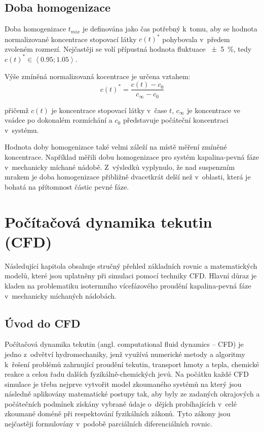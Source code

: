 \subsection{Doba homogenizace}
Doba homogenizace $t_{mix}$ je definována jako čas potřebný k~tomu, aby se hodnota normalizované koncentrace stopovací látky $c(t)^{*}$ pohybovala v~předem zvoleném rozmezí. Nejčastěji se volí přípustná hodnota fluktuace \SI{\pm 5}{\percent}, tedy $c(t)^{*} \in \left<\num{0.95};\num{1.05}\right>$. 

Výše zmíněná normalizovaná kocentrace je určena vztahem:
\begin{equation}
	c(t)^{*} = \frac{c(t) - c_{0}}{c_{\infty} - c_{0}}
	\label{eq:bezkon}
\end{equation}

\noindent přičemž $c(t)$ je koncentrace stopovací látky v~čase $t$, $c_{\infty}$ je koncentrace ve vsádce po dokonalém rozmíchání a $c_{0}$ představuje počáteční koncentraci v~systému.  

Hodnota doby homogenizace také velmi záleží na místě měření zmíněné koncentrace. Například \citet{buj99} měřili dobu homogenizace pro systém kapalina-pevná fáze v~mechanicky míchané nádobě. Z~výsledků vyplynulo, že nad suspenzním mrakem je doba homogenizace přibližně dvacetkrát delší než v~oblasti, která je bohatá na přítomnost částic pevné fáze.

\section{Počítačová dynamika tekutin (CFD)}
Následující kapitola obsahuje stručný přehled základních rovnic a matematických modelů, které jsou uplatněny při simulaci pomocí techniky CFD. Hlavní důraz je kladen na problematiku isotermního vícefázového proudění kapalina-pevná fáze v~mechanicky míchaných nádobách.

\subsection{Úvod do CFD}
Počítačová dynamika tekutin (angl. computational fluid dynamics -- CFD) je jedno z~odvětví hydromechaniky, jenž využívá numerické metody a algoritmy k~řešení problémů zahrnující proudění tekutin, transport hmoty a tepla, chemické reakce a celou řadu dalších fyzikálně-chemických jevů. Na počátku každé CFD simulace je třeba nejprve vytvořit model zkoumaného systémů na který jsou následně aplikovány matematické postupy tak, aby byly ze zadaných okrajových a počátečních podmínek získány vybrané údaje o~dějích probíhajících v~celé zkoumané doméně při respektování fyzikálních zákonů. Tyto zákony jsou nejčastěji formulovány v~podobě parciálních diferenciálních rovnic. 

